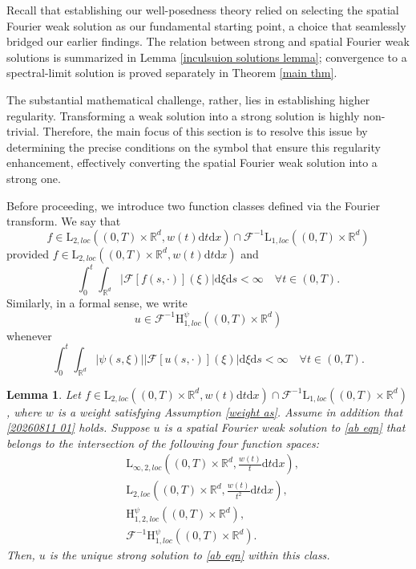 \documentclass[11pt,reqno]{amsart}
\newtheorem{lem}[thm]{Lemma}
\theoremstyle{definition}
\theoremstyle{remark}
\newcommand\bR{\mathbb{R}}
\newcommand\cF{\mathcal{F}}
\numberwithin{equation}{section}
\begin{document}
Recall that establishing our well-posedness theory relied on selecting the spatial Fourier weak solution as our fundamental starting point, a choice that seamlessly bridged our earlier findings. 
The relation between strong and spatial Fourier weak solutions is summarized in Lemma \ref{inculsuion solutions lemma}; convergence to a spectral-limit solution is proved separately in Theorem \ref{main thm}.

The substantial mathematical challenge, rather, lies in establishing higher regularity. 
Transforming a weak solution into a strong solution is highly non-trivial. 
Therefore, the main focus of this section is to resolve this issue by determining the precise conditions on the symbol that ensure this regularity enhancement, effectively converting the spatial Fourier weak solution into a strong one.



Before proceeding, we introduce two function classes defined via the Fourier transform. 
We say that
$$
f \in \mathrm{L}_{2,loc}\left( (0,T) \times \bR^d, w(t)\mathrm{d}t\mathrm{d}x \right) 
\cap \cF^{-1}\mathrm{L}_{1,loc}\left( (0,T) \times \bR^d \right)
$$
provided $f \in \mathrm{L}_{2,loc}\left( (0,T) \times \bR^d, w(t)\mathrm{d}t\mathrm{d}x \right)$ and
$$
\int_0^t\int_{\bR^d}|\cF[f(s,\cdot)](\xi)| \mathrm{d}\xi \mathrm{d}s < \infty \quad \forall t \in (0,T).
$$
Similarly, in a formal sense, we write
$$
u \in \cF^{-1}\mathrm{H}_{1,loc}^{\psi}\left( (0,T) \times \bR^d\right)
$$
whenever
$$
\int_0^t\int_{\bR^d} |\psi(s,\xi)| |\cF[u(s,\cdot)](\xi)| \mathrm{d}\xi \mathrm{d}s < \infty \quad \forall t \in (0,T).
$$

\begin{lem}
										\label{strong solution lem}
Let $f \in \mathrm{L}_{2,loc}\left( (0,T) \times \bR^d, w(t)\mathrm{d}t\mathrm{d}x \right) 
\cap \cF^{-1}\mathrm{L}_{1,loc}\left( (0,T) \times \bR^d\right)$, 
where $w$ is a weight satisfying Assumption \ref{weight as}. 
Assume in addition that \eqref{20260811 01} holds.
Suppose $u$ is a spatial Fourier weak solution to \eqref{ab eqn} that belongs to the intersection of the following four function spaces:
$$
\begin{aligned}
&\mathrm{L}_{\infty,2, loc}\left( (0,T) \times \bR^d ,\frac{w(t)}{t}\mathrm{d}t \mathrm{d}x\right),\\
&\mathrm{L}_{2, loc}\left( (0,T) \times \bR^d,\frac{w(t)}{t^2}\mathrm{d}t\mathrm{d}x \right),\\
& \mathrm{H}_{1,2,loc}^{\psi}\left( (0,T) \times \bR^d\right), \\
& \cF^{-1}\mathrm{H}_{1,loc}^{\psi}\left( (0,T) \times \bR^d\right).
\end{aligned}
$$
Then, $u$ is the unique strong solution to \eqref{ab eqn} within this class.

\end{lem}
\end{document}

